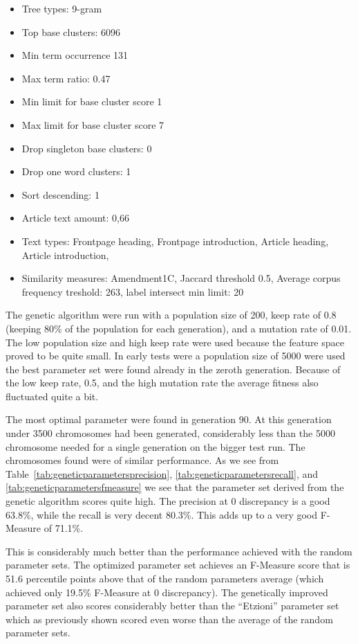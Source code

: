\begin{itemize}
  \item Tree types: 9-gram
  \item Top base clusters: 6096
  \item Min term occurrence 131
  \item Max term ratio: 0.47
  \item Min limit for base cluster score 1
  \item Max limit for base cluster score 7
  \item Drop singleton base clusters: 0
  \item Drop one word clusters: 1
  \item Sort descending: 1
  \item Article text amount: 0,66
  \item Text types: Frontpage heading, Frontpage introduction, Article heading, Article introduction, 
  \item Similarity measures: Amendment1C, Jaccard threshold 0.5, Average corpus frequency treshold: 263, label intersect min limit: 20
\end{itemize}

The genetic algorithm were run with a population size of 200, keep rate of 0.8 (keeping 80\% of the population for each generation), and a mutation rate of 0.01. The low population size and high keep rate were used because the feature space proved to be quite small. In early tests were a population size of 5000 were used the best parameter set were found already in the zeroth generation. Because of the low keep rate, 0.5, and the high mutation rate the average fitness also fluctuated quite a bit.

The most optimal parameter were found in generation 90. At this generation under 3500 chromosomes had been generated, considerably less than the 5000 chromosome needed for a single generation on the bigger test run. The chromosomes found were of similar performance. As we see from Table~\ref{tab:geneticparametersprecision}, \ref{tab:geneticparametersrecall}, and \ref{tab:geneticparametersfmeasure} we see that the parameter set derived from the genetic algorithm scores quite high. The precision at 0 discrepancy is a good 63.8\%, while the recall is very decent 80.3\%. This adds up to a very good F-Measure of 71.1\%.

This is considerably much better than the performance achieved with the random parameter sets. The optimized parameter set achieves an F-Measure score that is 51.6 percentile points above that of the random parameters average (which achieved only 19.5\% F-Measure at 0 discrepancy). The genetically improved parameter set also scores considerably better than the ``Etzioni'' parameter set which as previously shown scored even worse than the average of the random parameter sets.

